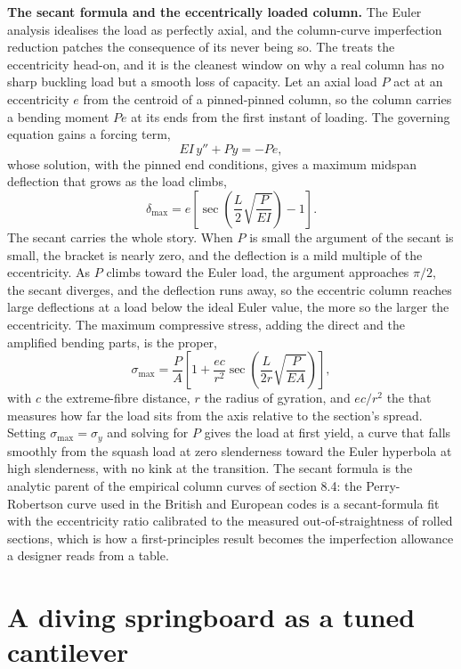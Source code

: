 \begin{mastery}
\textbf{The secant formula and the eccentrically loaded column.} The Euler
analysis idealises the load as perfectly axial, and the column-curve
imperfection reduction patches the consequence of its never being so. The
 treats the eccentricity head-on, and it is the
cleanest window on why a real column has no sharp buckling load but a
smooth loss of capacity. Let an axial load $P$ act at an eccentricity $e$
from the centroid of a pinned-pinned column, so the column carries a
bending moment $P e$ at its ends from the first instant of loading. The
governing equation gains a forcing term,
\[
EI\,y'' + P y = -P e,
\]
whose solution, with the pinned end conditions, gives a maximum midspan
deflection that grows as the load climbs,
\[
\delta_{\max} = e\left[\sec\!\left(\frac{L}{2}\sqrt{\frac{P}{EI}}\right)
- 1\right].
\]
The secant carries the whole story. When $P$ is small the argument of the
secant is small, the bracket is nearly zero, and the deflection is a mild
multiple of the eccentricity. As $P$ climbs toward the Euler load, the
argument approaches $\pi/2$, the secant diverges, and the deflection runs
away, so the eccentric column reaches large deflections at a load below the
ideal Euler value, the more so the larger the eccentricity. The maximum
compressive stress, adding the direct and the amplified bending parts, is
the  proper,
\[
\sigma_{\max} = \frac{P}{A}\left[1 + \frac{e c}{r^2}
\sec\!\left(\frac{L}{2r}\sqrt{\frac{P}{EA}}\right)\right],
\]
with $c$ the extreme-fibre distance, $r$ the radius of gyration, and
$e c/r^2$ the  that measures how far the load
sits from the axis relative to the section's spread. Setting $\sigma_{\max}
= \sigma_y$ and solving for $P$ gives the load at first yield, a curve that
falls smoothly from the squash load at zero slenderness toward the Euler
hyperbola at high slenderness, with no kink at the transition. The secant
formula is the analytic parent of the empirical column curves of section
8.4: the Perry-Robertson curve used in the British and European codes is a
secant-formula fit with the eccentricity ratio calibrated to the measured
out-of-straightness of rolled sections, which is how a first-principles
result becomes the imperfection allowance a designer reads from a table.
\end{mastery}

\section{A diving springboard as a tuned cantilever}

